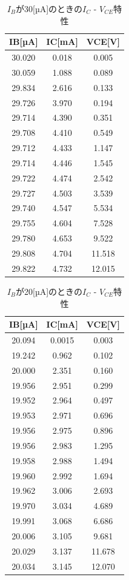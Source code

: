 \documentclass[a4j,10pt,dvipdfmx]{jarticle}
\begin{document}
  \begin{table}[H]
  \label{2}
  \begin{center}
  \caption{$I_B$が30[µA]のときの$I_C$ - $V_{CE}$特性}
  \begin{tabular}{ccc} \\
  \hline
  IB[µA] & IC[mA] & VCE[V] \\ \hline
  30.020  & 0.018  & 0.005  \\
  30.059  & 1.088  & 0.089  \\
  29.834  & 2.616  & 0.133  \\
  29.726  & 3.970  & 0.194  \\
  29.714  & 4.390  & 0.351  \\
  29.708  & 4.410  & 0.549  \\
  29.712  & 4.433  & 1.147  \\
  29.714  & 4.446  & 1.545  \\
  29.722  & 4.474  & 2.542  \\
  29.727  & 4.503  & 3.539  \\
  29.740  & 4.547  & 5.534  \\
  29.755  & 4.604  & 7.528  \\
  29.780  & 4.653  & 9.522  \\
  29.808  & 4.704  & 11.518  \\
  29.822  & 4.732  & 12.015  \\ \hline
  \end{tabular}
  \end{center}
  \end{table}
  \begin{table}[H]
  \label{3}
  \begin{center}
  \caption{$I_B$が20[µA]のときの$I_C$ - $V_{CE}$特性}
  \begin{tabular}{ccc} \\
  \hline
  IB[µA] & IC[mA] & VCE[V] \\ \hline
  20.094  & 0.0015 & 0.003 \\
  19.242  & 0.962  & 0.102  \\
  20.000  & 2.351  & 0.160  \\
  19.956  & 2.951  & 0.299  \\
  19.952  & 2.964  & 0.497  \\
  19.953  & 2.971  & 0.696  \\
  19.956  & 2.975  & 0.896  \\
  19.956  & 2.983  & 1.295  \\
  19.958  & 2.988  & 1.494  \\
  19.960  & 2.992  & 1.694  \\
  19.962  & 3.006  & 2.693  \\
  19.970  & 3.034  & 4.689  \\
  19.991  & 3.068  & 6.686  \\
  20.006  & 3.105  & 9.681  \\
  20.029  & 3.137  & 11.678  \\
  20.034  & 3.145  & 12.070  \\ \hline
  \end{tabular}
  \end{center}
  \end{table}
\end{document}
